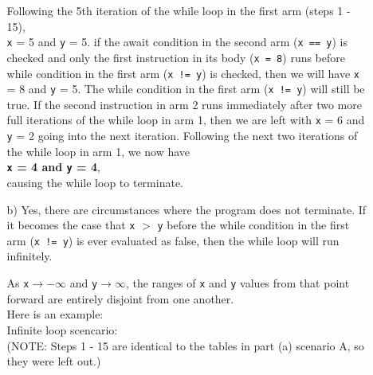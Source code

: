 \documentclass[11pt]{article}
\newcommand{\code}[1]{\texttt{#1}}
\begin{document}
\begin{enumerate}
\begin{enumerate}
	\hspace{0.8cm}Following the 5th iteration of the while loop in the first arm (steps 1 - 15),\\
	\code{x} = 5 and \code{y} = 5. if the await condition in the second arm (\code{x == y}) is checked and only the first instruction in its body (\code{x = 8}) runs before while condition in the first arm (\code{x != y}) is checked, then we will have \code{x} = 8 and \code{y} = 5. The while condition in the first arm (\code{x != y}) will still be true. If the second instruction in arm 2 runs immediately after two more full iterations of the while loop in arm 1, then  we are left with \code{x} = 6 and \code{y} = 2 going into the next iteration. Following the next two iterations of the while loop in arm 1, we now have \\ 
	\textbf{\code{x} = 4 and \code{y} = 4}, \\
	causing the while loop to terminate.\\
	
	\item[b)] \hspace{0.8cm}Yes, there are circumstances where the program does not terminate. If it becomes the case that \code{x} $>$ \code{y} before the while condition in the first arm (\code{x != y}) is ever evaluated as false, then the while loop will run infinitely.
	
	\hspace{0.8cm}As \code{x}$\to -\infty$ and \code{y}$\to \infty$, the ranges of  \code{x} and  \code{y} values from that point forward are entirely disjoint from one another.\\
	\hspace{0.8cm}Here is an example:\\
	
	Infinite loop scencario: \\
	(NOTE: Steps 1 - 15 are identical to the tables in part (a) scenario A, so they were left out.)\\
	

\end{enumerate}
\end{enumerate}
\end{document}
